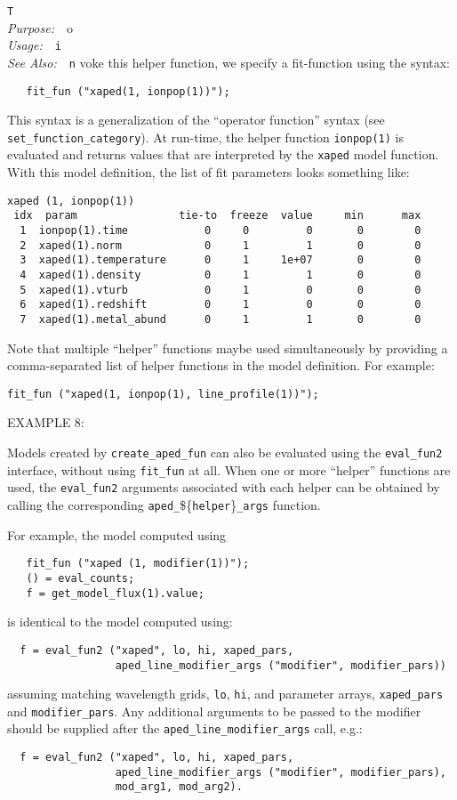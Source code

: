 \documentclass{book}
\makeatletter
\newif\ifpdf
\newenvironment{isisfunction}[4]%
{\index{{#1}@{\tt #1}}%
  \ifpdf
  \else
     \addcontentsline{toc}{subsection}{{#1} -- {#2}}
  \fi
  \vbox{
          \vspace*{\baselineskip}
          {\LARGE\tt #1}\vspace*{\baselineskip}\\
          {{\it Purpose:}~~{#2}}\\
          {{\it Usage:}~~{\tt #3}}\\
          {{\it See Also:}~~{\tt #4}}
       }
}%
{ }
\makeatother
\begin{document}
{\begin{isisfunction}
To invoke this helper function, we specify a fit-function using the syntax:
\begin{verbatim}
   fit_fun ("xaped(1, ionpop(1))");
\end{verbatim}
This syntax is a generalization of the ``operator function'' syntax (see
\verb|set_function_category|).  At run-time, the helper function
\verb|ionpop(1)| is evaluated and returns values that are interpreted by the
\verb|xaped| model function. With this model definition, the list of fit
parameters looks something like:
\begin{verbatim}
xaped (1, ionpop(1))
 idx  param                tie-to  freeze  value     min      max
  1  ionpop(1).time            0     0         0       0        0
  2  xaped(1).norm             0     1         1       0        0
  3  xaped(1).temperature      0     1     1e+07       0        0
  4  xaped(1).density          0     1         1       0        0
  5  xaped(1).vturb            0     1         0       0        0
  6  xaped(1).redshift         0     1         0       0        0
  7  xaped(1).metal_abund      0     1         1       0        0
\end{verbatim}

Note that multiple ``helper'' functions maybe used simultaneously by providing
a comma-separated list of helper functions in the model definition.  For
example:
\begin{verbatim}
fit_fun ("xaped(1, ionpop(1), line_profile(1))");
\end{verbatim}

EXAMPLE 8:

Models created by \verb|create_aped_fun| can also be evaluated using the
\verb|eval_fun2| interface, without using \verb|fit_fun| at all.  When one or
more ``helper'' functions are used, the \verb|eval_fun2| arguments associated
with each helper can be obtained by calling the corresponding
\verb|aped_|\$\{\verb|helper|\}\verb|_args| function.

For example, the model computed using
\begin{verbatim}
   fit_fun ("xaped (1, modifier(1))");
   () = eval_counts;
   f = get_model_flux(1).value;
\end{verbatim}
is identical to the model computed using:
\begin{verbatim}
  f = eval_fun2 ("xaped", lo, hi, xaped_pars,
                 aped_line_modifier_args ("modifier", modifier_pars))
\end{verbatim}
assuming matching wavelength grids, \verb|lo|, \verb|hi|, and
parameter arrays, \verb|xaped_pars| and \verb|modifier_pars|.
Any additional arguments to be passed to the modifier should
be supplied after the \verb|aped_line_modifier_args| call, e.g.:
\begin{verbatim}
  f = eval_fun2 ("xaped", lo, hi, xaped_pars,
                 aped_line_modifier_args ("modifier", modifier_pars),
                 mod_arg1, mod_arg2).
\end{verbatim}


\end{isisfunction}}
\end{document}
